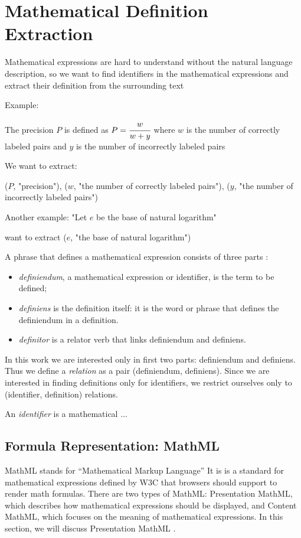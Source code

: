 \section{Mathematical Definition Extraction} \label{section:definitionextraction}
Mathematical expressions are hard to understand without the natural language description,
so we want to find identifiers in the mathematical expressions and extract their
definition from the surrounding text

Example:

The precision $P$ is defined as $P = \cfrac{w}{w + y}$ where $w$ is the number of
correctly labeled pairs and $y$ is the number of incorrectly labeled pairs

We want to extract:

($P$, "precision"),
($w$, "the number of correctly labeled pairs"),
($y$, "the number of incorrectly labeled pairs")

Another example: "Let $e$ be the base of natural logarithm"

want to extract ($e$, "the base of natural logarithm")


A phrase that defines a mathematical expression consists of three parts \cite{kristianto2012extracting}:

\begin{itemize}
  \item \emph{definiendum}, a mathematical expression or identifier, is the term to be defined;
  \item \emph{definiens} is the definition itself: it is the word or phrase that defines the definiendum in a definition.
  \item \emph{definitor} is a relator verb that links definiendum and definiens.
\end{itemize}

In this work we are interested only in first two parts: definiendum and definiens.
Thus we define a \emph{relation} as a pair (definiendum, definiens). Since we are
interested in finding definitions only for identifiers, we restrict ourselves only
to (identifier, definition) relations.


An \emph{identifier} is a mathematical ...


\subsection{Formula Representation: MathML} \label{sec:mathml}

MathML \cite{mathml} stands for ``Mathematical Markup Language''
It is is a standard for mathematical
expressions defined by W3C that browsers should support to render math
formulas. There are two types of MathML: Presentation MathML, which describes
how mathematical expressions should be displayed, and Content MathML, which
focuses on the meaning of mathematical expressions. In this section, we will discuss
Presentation MathML .


